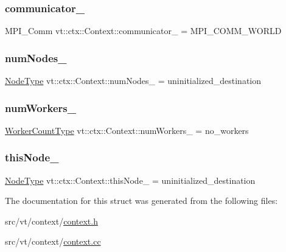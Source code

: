 \subsubsection{\texorpdfstring{communicator\+\_\+}{communicator\_}}
{\footnotesize\ttfamily M\+P\+I\+\_\+\+Comm vt\+::ctx\+::\+Context\+::communicator\+\_\+ = M\+P\+I\+\_\+\+C\+O\+M\+M\+\_\+\+W\+O\+R\+LD\hspace{0.3cm}{\ttfamily [private]}}

\mbox{\label{structvt_1_1ctx_1_1_context_a58cc20215314e915f43b829ad0470299}} 
\subsubsection{\texorpdfstring{num\+Nodes\+\_\+}{numNodes\_}}
{\footnotesize\ttfamily \hyperlink{namespacevt_a866da9d0efc19c0a1ce79e9e492f47e2}{Node\+Type} vt\+::ctx\+::\+Context\+::num\+Nodes\+\_\+ = uninitialized\+\_\+destination\hspace{0.3cm}{\ttfamily [private]}}

\mbox{\label{structvt_1_1ctx_1_1_context_a16e8488c6e6ad26c387ad6ef19f726b9}} 
\subsubsection{\texorpdfstring{num\+Workers\+\_\+}{numWorkers\_}}
{\footnotesize\ttfamily \hyperlink{namespacevt_aa93398ea48f2cb6c188512250f7cc248}{Worker\+Count\+Type} vt\+::ctx\+::\+Context\+::num\+Workers\+\_\+ = no\+\_\+workers\hspace{0.3cm}{\ttfamily [private]}}

\mbox{\label{structvt_1_1ctx_1_1_context_a5fcea79d2fede6e9945433621894624c}} 
\subsubsection{\texorpdfstring{this\+Node\+\_\+}{thisNode\_}}
{\footnotesize\ttfamily \hyperlink{namespacevt_a866da9d0efc19c0a1ce79e9e492f47e2}{Node\+Type} vt\+::ctx\+::\+Context\+::this\+Node\+\_\+ = uninitialized\+\_\+destination\hspace{0.3cm}{\ttfamily [private]}}



The documentation for this struct was generated from the following files\+:\begin{DoxyCompactItemize}
\item 
src/vt/context/\hyperlink{context_8h}{context.\+h}\item 
src/vt/context/\hyperlink{context_8cc}{context.\+cc}\end{DoxyCompactItemize}
